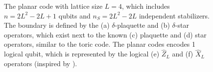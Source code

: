 
\def\QS{15}
\def\s{1.5}
\begin{figure}[htbp]
  \centering
  \caption{The planar code with lattice size $L=4$, which includes $n = 2L^2-2L+1$ qubits and $n_S = 2L^2-2L$ independent stabilizers. The boundary is defined by the (a) $\delta$-plaquette and (b) $\delta$-star operators, which exist next to the known (c) plaquette and (d) star operators, similar to the toric code. The planar codes encodes 1 logical qubit, which is represented by the logical (e) $\hat{Z}_L$ and (f) $\hat{X}_L$ operators (inspired by \cite{browne}).}\label{sf:fig_planar}
\end{figure}